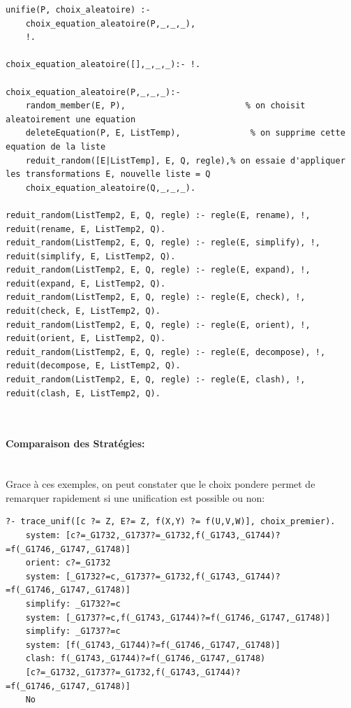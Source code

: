 \documentclass[10pt,a4paper]{report}
\begin{document}
\begin{lstlisting}[caption ={Stratégie choix aléatoire dans $main.pl$}]
%unification choix aleatoire
unifie(P, choix_aleatoire) :-
	choix_equation_aleatoire(P,_,_,_),
	!.
	
choix_equation_aleatoire([],_,_,_):- !.

choix_equation_aleatoire(P,_,_,_):-
	random_member(E, P), 						% on choisit aleatoirement une equation
	deleteEquation(P, E, ListTemp),				 % on supprime cette equation de la liste
	reduit_random([E|ListTemp], E, Q, regle),% on essaie d'appliquer les transformations E, nouvelle liste = Q
	choix_equation_aleatoire(Q,_,_,_).

reduit_random(ListTemp2, E, Q, regle) :- regle(E, rename), !, reduit(rename, E, ListTemp2, Q).
reduit_random(ListTemp2, E, Q, regle) :- regle(E, simplify), !, reduit(simplify, E, ListTemp2, Q).
reduit_random(ListTemp2, E, Q, regle) :- regle(E, expand), !, reduit(expand, E, ListTemp2, Q).
reduit_random(ListTemp2, E, Q, regle) :- regle(E, check), !, reduit(check, E, ListTemp2, Q).
reduit_random(ListTemp2, E, Q, regle) :- regle(E, orient), !, reduit(orient, E, ListTemp2, Q).
reduit_random(ListTemp2, E, Q, regle) :- regle(E, decompose), !, reduit(decompose, E, ListTemp2, Q).
reduit_random(ListTemp2, E, Q, regle) :- regle(E, clash), !, reduit(clash, E, ListTemp2, Q).
\end{lstlisting}~\\

\paragraph{Comparaison des Stratégies:} ~\\

Grace à ces exemples, on peut constater que le choix pondere permet de remarquer rapidement si une unification est possible ou non:

\begin{lstlisting}[caption ={Stratégie choix premier dans $main.pl$}]
?- trace_unif([c ?= Z, E?= Z, f(X,Y) ?= f(U,V,W)], choix_premier).
	system: [c?=_G1732,_G1737?=_G1732,f(_G1743,_G1744)?=f(_G1746,_G1747,_G1748)]
	orient: c?=_G1732
	system: [_G1732?=c,_G1737?=_G1732,f(_G1743,_G1744)?=f(_G1746,_G1747,_G1748)]
	simplify: _G1732?=c
	system: [_G1737?=c,f(_G1743,_G1744)?=f(_G1746,_G1747,_G1748)]
	simplify: _G1737?=c
	system: [f(_G1743,_G1744)?=f(_G1746,_G1747,_G1748)]
	clash: f(_G1743,_G1744)?=f(_G1746,_G1747,_G1748)
	[c?=_G1732,_G1737?=_G1732,f(_G1743,_G1744)?=f(_G1746,_G1747,_G1748)]
	No

\end{lstlisting}
\end{document}
